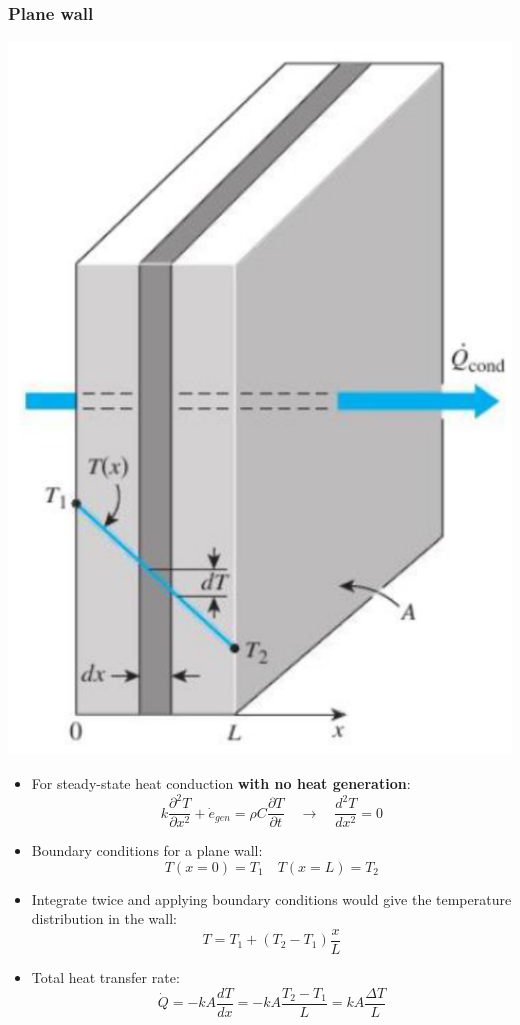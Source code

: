 \documentclass[11pt]{article}
\begin{document}
\subsubsection{Plane wall}
\label{sec:orgac98554}
\begin{center}
\includegraphics[scale=0.7]{./images/steady-state-heat-conduction-plane-wall.png}
\end{center}
\begin{itemize}
\item For steady-state heat conduction \textbf{with no heat generation}:
\[k \frac{\partial^2 T}{\partial x^2} + \dot{e}_{gen} = \rho C \frac{\partial T}{\partial t} \quad \rightarrow \quad \frac{d^2 T}{dx^2} = 0\]
\item Boundary conditions for a plane wall:
\[T(x = 0) = T_1 \quad T(x = L) = T_2\]
\item Integrate twice and applying boundary conditions would give the temperature distribution in the wall:
\[T = T_1 + (T_2 - T_1) \frac{x}{L}\]
\item Total heat transfer rate:
\[\dot{Q} = -kA \frac{dT}{dx} = -kA \frac{T_2 - T_1}{L} = kA \frac{\Delta T}{L}\]
\end{itemize}
\end{document}
